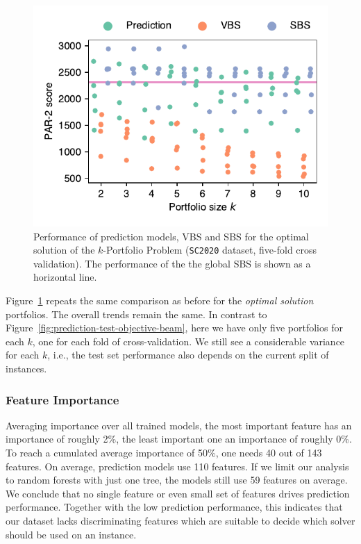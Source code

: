 \documentclass[conference]{IEEEtran}
\begin{document}
\begin{figure}[t]
	\centering
	\includegraphics[width=0.9\columnwidth, trim=0 15 0 10, clip]{plots/prediction-test-objective-optimal-2020.pdf}
	\caption{
		Performance of prediction models, VBS and SBS for the optimal solution of the $k$-Portfolio Problem (\texttt{SC2020} dataset, five-fold cross validation). 
		The performance of the the global SBS is shown as a horizontal line.
	}
	\label{fig:prediction-test-objective-optimal-2020}
\end{figure}

Figure~\ref{fig:prediction-test-objective-optimal-2020} repeats the same comparison as before for the \emph{optimal solution} portfolios.
The overall trends remain the same.
In contrast to Figure~\ref{fig:prediction-test-objective-beam}, here we have only five portfolios for each $k$, one for each fold of cross-validation.
We still see a considerable variance for each $k$, i.e., the test set performance also depends on the current split of instances.

\subsubsection{Feature Importance}

Averaging importance over all trained models, the most important feature has an importance of roughly 2\%, the least important one an importance of roughly 0\%.
To reach a cumulated average importance of 50\%, one needs 40 out of 143 features.
On average, prediction models use 110 features.
If we limit our analysis to random forests with just one tree, the models still use 59 features on average.
We conclude that no single feature or even small set of features drives prediction performance.
Together with the low prediction performance, this indicates that our dataset lacks discriminating features which are suitable to decide which solver should be used on an instance.
\end{document}

